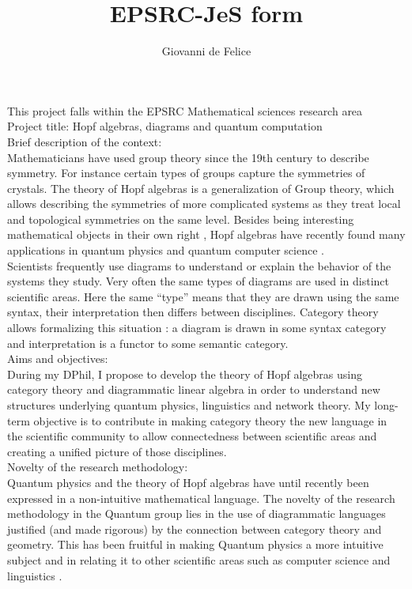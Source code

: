 \documentclass{article}
\title{EPSRC-JeS form}
\author{Giovanni de Felice}
\begin{document}
\maketitle

This project falls within the EPSRC Mathematical sciences research area\\
Project title: Hopf algebras, diagrams and quantum computation\\

Brief description of the context:\\
Mathematicians have used group theory since the 19th century to describe symmetry. For instance certain types of groups capture the symmetries of crystals.  The theory of Hopf algebras is a generalization of Group theory, which allows describing the symmetries of more complicated systems as they treat local and topological symmetries on the same level. Besides being interesting mathematical objects in their own right \cite{Majid95}, Hopf algebras have recently found many applications in quantum physics and quantum computer science \cite{Kitaev03} \cite{Panangaden11}. \\
Scientists frequently use diagrams to understand or explain the behavior of the systems they study. Very often the same types of diagrams are used in distinct scientific areas. Here the same “type” means that they are drawn using the same syntax, their interpretation then differs between disciplines. Category theory allows formalizing this situation \cite{Lawvere63}: a diagram is drawn in some syntax category and interpretation is a functor to some semantic category.\\
 
Aims and objectives:\\
During my DPhil, I propose to develop the theory of Hopf algebras using category theory and diagrammatic linear algebra in order to understand new structures underlying quantum physics, linguistics and network theory. My long-term objective is to contribute in making category theory the new language in the scientific community to allow connectedness between scientific areas and creating a unified picture of those disciplines.\\

Novelty of the research methodology:\\
Quantum physics and the theory of Hopf algebras have until recently been expressed in a non-intuitive mathematical language. The novelty of the research methodology in the Quantum group lies in the use of diagrammatic languages justified (and made rigorous) by the connection between category theory and geometry. This has been fruitful in making Quantum physics a more intuitive subject \cite{Coecke17} and in relating it to other scientific areas such as computer science and linguistics \cite{Coecke10}.\\
\end{document}
